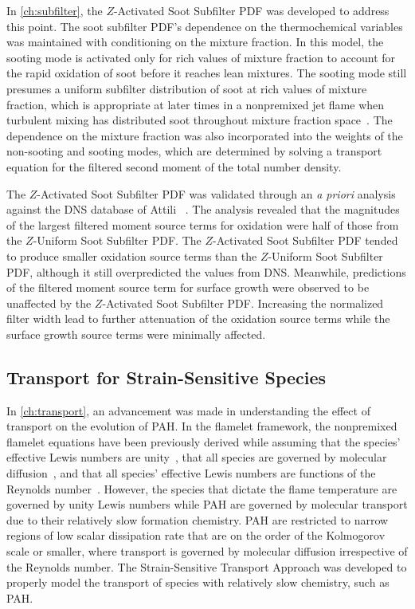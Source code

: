 In \cref{ch:subfilter}, the $Z$-Activated Soot Subfilter PDF was developed to address this point. The soot subfilter PDF's dependence on the thermochemical variables was maintained with conditioning on the mixture fraction. In this model, the sooting mode is activated only for rich values of mixture fraction to account for the rapid oxidation of soot before it reaches lean mixtures. The sooting mode still presumes a uniform subfilter distribution of soot at rich values of mixture fraction, which is appropriate at later times in a nonpremixed jet flame when turbulent mixing has distributed soot throughout mixture fraction space~\cite{attili2014}. The dependence on the mixture fraction was also incorporated into the weights of the non-sooting and sooting modes, which are determined by solving a transport equation for the filtered second moment of the total number density.

The $Z$-Activated Soot Subfilter PDF was validated through an \textit{a priori} analysis against the DNS database of Attili \etal~\cite{attili2014}. The analysis revealed that the magnitudes of the largest filtered moment source terms for oxidation were half of those from the $Z$-Uniform Soot Subfilter PDF. The $Z$-Activated Soot Subfilter PDF tended to produce smaller oxidation source terms than the $Z$-Uniform Soot Subfilter PDF, although it still overpredicted the values from DNS. Meanwhile, predictions of the filtered moment source term for surface growth were observed to be unaffected by the $Z$-Activated Soot Subfilter PDF. Increasing the normalized filter width lead to further attenuation of the oxidation source terms while the surface growth source terms were minimally affected.

\subsection{Transport for Strain-Sensitive Species}
\label{sec:conclusion:contributions:transport}

In \cref{ch:transport}, an advancement was made in understanding the effect of transport on the evolution of PAH. In the flamelet framework, the nonpremixed flamelet equations have been previously derived while assuming that the species' effective Lewis numbers are unity~\cite{peters1984}, that all species are governed by molecular diffusion~\cite{pitsch1998}, and that all species' effective Lewis numbers are functions of the Reynolds number~\cite{wang2016}. However, the species that dictate the flame temperature are governed by unity Lewis numbers while PAH are governed by molecular transport due to their relatively slow formation chemistry. PAH are restricted to narrow regions of low scalar dissipation rate that are on the order of the Kolmogorov scale or smaller, where transport is governed by molecular diffusion irrespective of the Reynolds number. The Strain-Sensitive Transport Approach was developed to properly model the transport of species with relatively slow chemistry, such as PAH.

